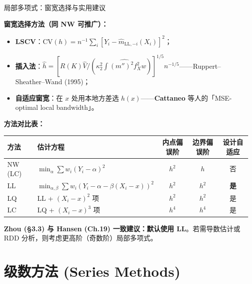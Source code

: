 \documentclass[aspectratio=169, 10pt]{beamer}
\renewcommand{\arraystretch}{1.05}
\begin{document}
\begin{frame}{局部多项式：窗宽选择与实用建议}

  \textbf{窗宽选择方法（同 NW 可推广）：}
  \begin{itemize}
    \item \textbf{LSCV}：$\text{CV}(h) = n^{-1}\sum_i [Y_i - \hat m_{\text{LL},-i}(X_i)]^2$；
    \item \textbf{插入法}：$\hat h = \left[R(K)\hat V/(\kappa_2^2\widehat{\int(m'')^2 f_X^2 w})\right]^{1/5} n^{-1/5}$——Ruppert--Sheather--Wand (1995)；
    \item \textbf{自适应窗宽}：在 $x$ 处用本地方差选 $h(x)$——\textbf{Cattaneo} 等人的「MSE-optimal local bandwidth」。
  \end{itemize}


  \begin{highlightbox}
    \textbf{方法对比表：}
  \end{highlightbox}
  \centering\small
  \renewcommand{\arraystretch}{1.25}
  \begin{tabular}{@{}llccc@{}}
    \toprule
    方法 & 估计方程 & 内点偏误阶 & 边界偏误阶 & 设计自适应 \\
    \midrule
    NW (LC) & $\min_\alpha \sum w_i(Y_i-\alpha)^2$ & $h^2$ & $h$ & 否 \\
    LL      & $\min_{\alpha,\beta} \sum w_i(Y_i-\alpha-\beta(X_i-x))^2$ & $h^2$ & $h^2$ & \textbf{是} \\
    LQ      & LL + $(X_i-x)^2$ 项 & $h^2$ & $h^2$ & 是 \\
    LC      & LQ + $(X_i-x)^3$ 项 & $h^4$ & $h^4$ & 是 \\
    \bottomrule
  \end{tabular}

  \begin{keybox}
    \textbf{Zhou (§3.3) 与 Hansen (Ch.19) 一致建议：}\textbf{默认使用 LL}。若需导数估计或 RDD 分析，则考虑更高阶（奇数阶）局部多项式。
  \end{keybox}

\end{frame}



\section{级数方法 (Series Methods)}
\end{document}
